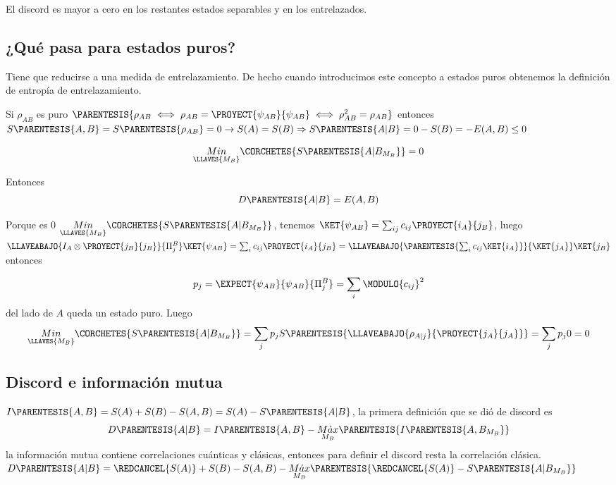 El discord es mayor a cero en los restantes estados separables y en
los entrelazados. 

\subsection{¿Qué pasa para estados puros?}

Tiene que reducirse a una medida de entrelazamiento. De hecho cuando
introducimos este concepto a estados puros obtenemos la definición
de entropía de entrelazamiento.

Si $\rho_{AB}$ es puro $\PARENTESIS{\rho_{AB}\iff\rho_{AB}=\PROYECT{\psi_{AB}}{\psi_{AB}}\iff\rho_{AB}^{2}=\rho_{AB}}$
entonces $S\PARENTESIS{A,B}=S\PARENTESIS{\rho_{AB}}=0\rightarrow S(A)=S(B)\Rightarrow S\PARENTESIS{A|B}=0-S(B)=-E(A,B)\leq0$

\[
\underset{\LLAVES{M_{B}}}{Min}\CORCHETES{S\PARENTESIS{A|B_{M_{B}}}}=0
\]

Entonces 
\[
D\PARENTESIS{A|B}=E(A,B)
\]

Porque es 0 $\underset{\LLAVES{M_{B}}}{Min}\CORCHETES{S\PARENTESIS{A|B_{M_{B}}}}$,
tenemos $\KET{\psi_{AB}}=\sum_{ij}c_{ij}\PROYECT{i_{A}}{j_{B}}$,
luego $\LLAVEABAJO{I_{A}\otimes\PROYECT{j_{B}}{j_{B}}}{\Pi_{j}^{B}}\KET{\psi_{AB}}=\sum_{i}c_{ij}\PROYECT{i_{A}}{j_{B}}=\LLAVEABAJO{\PARENTESIS{\sum_{i}c_{ij}\KET{i_{A}}}}{\KET{j_{A}}}\KET{j_{B}}$
entonces

\[
p_{j}=\EXPECT{\psi_{AB}}{\psi_{AB}}{\Pi_{j}^{B}}=\sum_{i}\MODULO{c_{ij}}^{2}
\]
del lado de $A$ queda un estado puro. Luego 
\[
\underset{\LLAVES{M_{B}}}{Min}\CORCHETES{S\PARENTESIS{A|B_{M_{B}}}}=\sum_{j}p_{j}S\PARENTESIS{\LLAVEABAJO{\rho_{A|j}}{\PROYECT{j_{A}}{j_{A}}}}=\sum_{j}p_{j}0=0
\]


\subsection{Discord e información mutua}

$I\PARENTESIS{A,B}=S(A)+S(B)-S(A,B)=S(A)-S\PARENTESIS{A|B}$, la primera
definición que se dió de discord es 
\[
D\PARENTESIS{A|B}=I\PARENTESIS{A,B}-\text{\ensuremath{\underset{M_{B}}{M\acute{a}x}}}\PARENTESIS{I\PARENTESIS{A,B_{M_{B}}}}
\]
la información mutua contiene correlaciones cuánticas y clásicas,
entonces para definir el discord resta la correlación clásica. $D\PARENTESIS{A|B}=\REDCANCEL{S(A)}+S(B)-S(A,B)-\text{\ensuremath{\underset{M_{B}}{M\acute{a}x}}}\PARENTESIS{\REDCANCEL{S(A)}-S\PARENTESIS{A|B_{M_{B}}}}$

